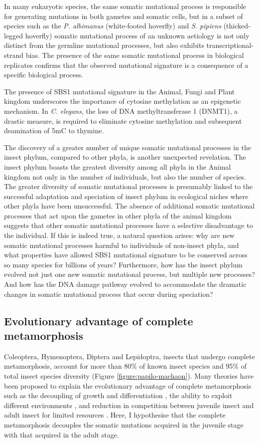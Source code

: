In many eukaryotic species, the same somatic mutational process is responsible for generating mutations in both gametes and somatic cells, but in a subset of species such as the \textit{P. albimanus} (white-footed hoverfly) and \textit{S. pipiens} (thicked-legged hoverfly) somatic mutational process of an unknown aetiology is not only distinct from the germline mutational processes, but also exhibits transcriptional-strand bias. The presence of the same somatic mutational process in biological replicates confirms that the observed mutational signature is a consequence of a specific biological process. 

The presence of SBS1 mutational signature in the Animal, Fungi and Plant kingdom underscores the importance of cytosine methylation as an epigenetic mechanism. In \textit{C. elegans}, the loss of DNA methyltransferase 1 (DNMT1), a drastic measure, is required to eliminate cytosine methylation and subsequent deamination of 5mC to thymine. 

The discovery of a greater number of unique somatic mutational processes in the insect phylum, compared to other phyla, is another unexpected revelation. The insect phylum boasts the greatest diversity among all phyla in the Animal kingdom not only in the number of individuals, but also the number of species. The greater diversity of somatic mutational processes is presumably linked to the successful adaptation and speciation of insect phylum in ecological niches where other phyla have been unsuccessful. The absence of additional somatic mutational processes that act upon the gametes in other phyla of the animal kingdom suggests that other somatic mutational processes have a selective disadvantage to the individual. If this is indeed true, a natural question arises: why are new somatic mutational processes harmful to individuals of non-insect phyla, and what properties have allowed SBS1 mutational signature to be conserved across so many species for billions of years? Furthermore, how has the insect phylum evolved not just one new somatic mutational process, but multiple new processes? And how has the DNA damage pathway evolved to accommodate the dramatic changes in somatic mutational process that occur during speciation? 

\subsection{Evolutionary advantage of complete metamorphosis}

Coleoptera, Hymenoptera, Diptera and Lepidoptra, insects that undergo complete metamorphosis, account for more than 80\% of known insect species and 95\% of total insect species diversity (Figure \ref{figure:papilo-machaon}). Many theories have been proposed to explain the evolutionary advantage of complete metamorphosis such as the decoupling of growth and differentiation \cite{Rolff2019-ef}, the ability to exploit different environments \cite{Darwin1859}, and reduction in competition between juvenile insect and adult insect for limited resources \cite{Ebenman1992-in}. Here, I hypothesise that the complete metamorphosis decouples the somatic mutations acquired in the juvenile stage with that acquired in the adult stage. 

